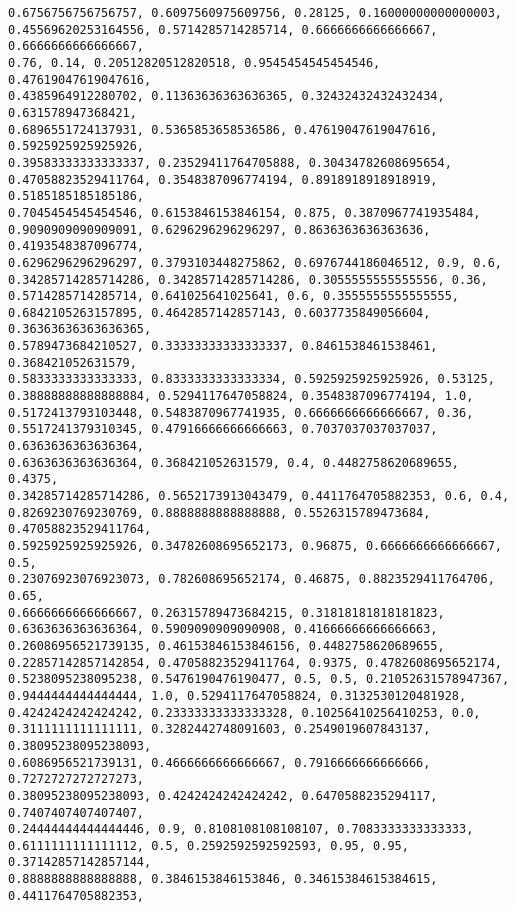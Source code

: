 \documentclass[11pt]{article}
\begin{document}
\begin{Verbatim}[commandchars=\\\{\}]
0.6756756756756757, 0.6097560975609756, 0.28125, 0.16000000000000003,
0.45569620253164556, 0.5714285714285714, 0.6666666666666667, 0.6666666666666667,
0.76, 0.14, 0.20512820512820518, 0.9545454545454546, 0.47619047619047616,
0.4385964912280702, 0.11363636363636365, 0.32432432432432434, 0.631578947368421,
0.6896551724137931, 0.5365853658536586, 0.47619047619047616, 0.5925925925925926,
0.39583333333333337, 0.23529411764705888, 0.30434782608695654,
0.47058823529411764, 0.3548387096774194, 0.8918918918918919, 0.5185185185185186,
0.7045454545454546, 0.6153846153846154, 0.875, 0.3870967741935484,
0.9090909090909091, 0.6296296296296297, 0.8636363636363636, 0.4193548387096774,
0.6296296296296297, 0.3793103448275862, 0.6976744186046512, 0.9, 0.6,
0.34285714285714286, 0.34285714285714286, 0.3055555555555556, 0.36,
0.5714285714285714, 0.641025641025641, 0.6, 0.3555555555555555,
0.6842105263157895, 0.4642857142857143, 0.6037735849056604, 0.36363636363636365,
0.5789473684210527, 0.33333333333333337, 0.8461538461538461, 0.368421052631579,
0.5833333333333333, 0.8333333333333334, 0.5925925925925926, 0.53125,
0.38888888888888884, 0.5294117647058824, 0.3548387096774194, 1.0,
0.5172413793103448, 0.5483870967741935, 0.6666666666666667, 0.36,
0.5517241379310345, 0.47916666666666663, 0.7037037037037037, 0.6363636363636364,
0.6363636363636364, 0.368421052631579, 0.4, 0.4482758620689655, 0.4375,
0.34285714285714286, 0.5652173913043479, 0.4411764705882353, 0.6, 0.4,
0.8269230769230769, 0.8888888888888888, 0.5526315789473684, 0.47058823529411764,
0.5925925925925926, 0.34782608695652173, 0.96875, 0.6666666666666667, 0.5,
0.23076923076923073, 0.782608695652174, 0.46875, 0.8823529411764706, 0.65,
0.6666666666666667, 0.26315789473684215, 0.31818181818181823,
0.6363636363636364, 0.5909090909090908, 0.41666666666666663,
0.26086956521739135, 0.46153846153846156, 0.4482758620689655,
0.22857142857142854, 0.47058823529411764, 0.9375, 0.4782608695652174,
0.5238095238095238, 0.5476190476190477, 0.5, 0.5, 0.21052631578947367,
0.9444444444444444, 1.0, 0.5294117647058824, 0.3132530120481928,
0.4242424242424242, 0.23333333333333328, 0.10256410256410253, 0.0,
0.3111111111111111, 0.3282442748091603, 0.2549019607843137, 0.38095238095238093,
0.6086956521739131, 0.4666666666666667, 0.7916666666666666, 0.7272727272727273,
0.38095238095238093, 0.4242424242424242, 0.6470588235294117, 0.7407407407407407,
0.24444444444444446, 0.9, 0.8108108108108107, 0.7083333333333333,
0.6111111111111112, 0.5, 0.2592592592592593, 0.95, 0.95, 0.37142857142857144,
0.8888888888888888, 0.3846153846153846, 0.34615384615384615, 0.4411764705882353,

\end{Verbatim}
\end{document}
